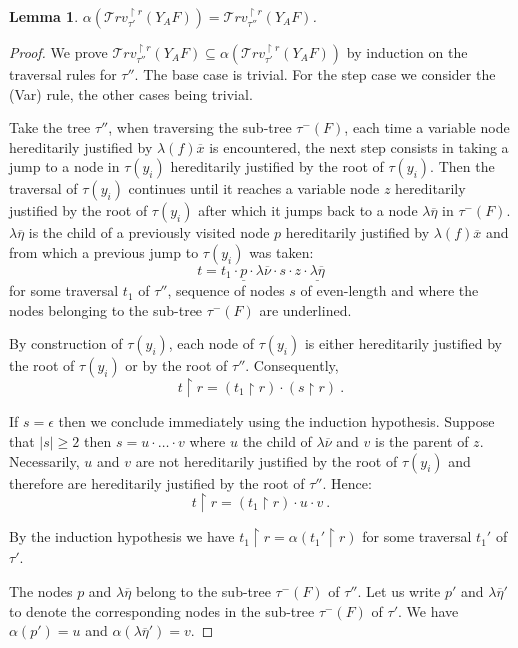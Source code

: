 \documentclass{article}
\newtheorem{lemma}[theorem]{Lemma}
\newcommand{\travset}{\mathcal{T}rv}
\begin{document}
\begin{lemma}
$\alpha(\travset^{\upharpoonright r}_{\tau'}(Y_A F)) = \travset^{\upharpoonright r}_{\tau''}(Y_A F)$.
\end{lemma}
\begin{proof}
We prove $\travset^{\upharpoonright r}_{\tau''}(Y_A F) \subseteq \alpha(\travset^{\upharpoonright r}_{\tau'}(Y_A F))$ by induction on the traversal rules for $\tau''$.
The base case is trivial. For the step case we consider the (Var) rule, the other cases being trivial.

Take the tree $\tau''$, when traversing the sub-tree $\tau^-(F)$, each time a variable node hereditarily justified by $\lambda (f) \overline{x}$ is encountered, the next step consists in taking a jump to a node in $\tau(y_i)$ hereditarily justified by the root of $\tau(y_i)$. Then the traversal of $\tau(y_i)$ continues until it reaches a variable node $z$ hereditarily justified by the root of $\tau(y_i)$ after which it jumps back to a node $\lambda \overline{\eta}$ in $\tau^-(F)$. $\lambda \overline{\eta}$ is the child of a previously visited node $p$ hereditarily justified by $\lambda (f) \overline{x}$ and from which a previous jump to $\tau(y_i)$ was taken:
$$ t = t_1 \cdot \underline{p} \cdot \lambda \overline{\nu} \cdot s \cdot z \cdot \underline{\lambda \overline{\eta}}$$
for some traversal $t_1$ of $\tau''$, sequence of nodes $s$ of even-length and where the nodes belonging to the sub-tree $\tau^-(F)$ are underlined.

By construction of $\tau(y_i)$, each node of $\tau(y_i)$ is either hereditarily justified by the root of $\tau(y_i)$
or by the root of $\tau''$. Consequently,
$$ t\upharpoonright r = (t_1\upharpoonright r) \cdot  (s \upharpoonright r) \ .$$

If $s = \epsilon$ then we conclude immediately using the induction hypothesis.
Suppose that $|s|\geq 2$ then $s = u\cdot \ldots \cdot v$ where $u$ the child of $\lambda \overline{\nu}$ and $v$ is the parent of $z$.
Necessarily, $u$ and $v$ are not hereditarily justified by the root of $\tau(y_i)$ and therefore are hereditarily justified by the root of $\tau''$. Hence:
$$ t\upharpoonright r = (t_1\upharpoonright r) \cdot  u \cdot v \ .$$

By the  induction hypothesis we have $t_1\upharpoonright r = \alpha(t_1'\upharpoonright r)$ for some traversal $t_1'$  of $\tau'$.

The nodes $p$ and $\lambda \overline{\eta}$ belong
to the sub-tree $\tau^-(F)$ of $\tau''$. Let us write $p'$ and $\lambda \overline{\eta}'$ to denote the corresponding nodes in the sub-tree $\tau^-(F)$ of $\tau'$. We have $\alpha(p') = u$ and $\alpha(\lambda \overline{\eta}') = v$.


\end{proof}
\end{document}

